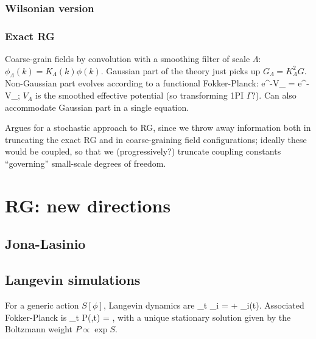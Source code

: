 \documentclass[notitlepage,openany,11pt]{report}
\theoremstyle{plain}%
\numberwithin{equation}{section}
\begin{document}
\subsubsection{Wilsonian version} 




\subsubsection{Exact RG}
\cite{Gaite:04}

Coarse-grain fields by convolution with a smoothing filter of scale $\Lambda$: $\phi_{\Lambda} (k) = K_{\Lambda}(k) \phi(k)$. Gaussian part of the theory just picks up $G_{\Lambda} = K_{\Lambda}^{2}G$. Non-Gaussian part evolves according to a functional Fokker-Planck:
\be
\frac{\partial}{\partial \Lambda} e^{-V_{\Lambda}} =    e^{-V_{\Lambda}};
\ee
$V_{\Lambda}$ is the smoothed effective potential (so transforming 1PI $\Gamma$?). Can also accommodate Gaussian part in a single equation.

Argues for a stochastic approach to RG, since we throw away information both in truncating the exact RG and in coarse-graining field configurations; ideally these would be coupled, so that we (progressively?) truncate coupling constants ``governing'' small-scale degrees of freedom.



\section{RG: new directions}

\subsection{Jona-Lasinio}

\subsection{Langevin simulations}
For a generic action $S[\phi]$, Langevin dynamics are
\be
\partial_{t} \phi_{i} =  + \eta_{i}(t).
\ee
Associated Fokker-Planck is
\be
\partial_{t} P(\phi,t) =  ,
\ee
with a unique stationary solution given by the Boltzmann weight $P \propto \exp S$. 
\end{document}
